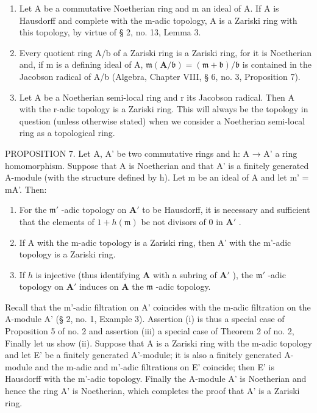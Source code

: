 \begin{enumerate}
\def\labelenumi{(\arabic{enumi})}
\item
  Let A be a commutative Noetherian ring and m an ideal of A. If A is Hausdorff and complete with the m-adic topology, A is a Zariski ring with this topology, by virtue of § 2, no. 13, Lemma 3.
\item
  Every quotient ring A/b of a Zariski ring is a Zariski ring, for it is Noetherian and, if m is a defining ideal of A, \(\mathfrak{m}(\mathbf{A}/\mathfrak{b}) = (\mathfrak{m} + \mathfrak{b})/\mathfrak{b}\) is contained in the Jacobson radical of A/b (Algebra, Chapter VIII, § 6, no. 3, Proposition 7).
\item
  Let A be a Noetherian semi-local ring and r its Jacobson radical. Then A with the r-adic topology is a Zariski ring. This will always be the topology in question (unless otherwise stated) when we consider a Noetherian semi-local ring as a topological ring.
\end{enumerate}

PROPOSITION 7. Let A, A' be two commutative rings and h: A → A' a ring homomorphism. Suppose that A is Noetherian and that A' is a finitely generated A-module (with the structure defined by h). Let m be an ideal of A and let m' = mA'. Then:

\begin{enumerate}
\def\labelenumi{(\roman{enumi})}
\item
  For the \(\mathfrak{m}'\) -adic topology on \(\mathbf{A}'\) to be Hausdorff, it is necessary and sufficient that the elements of \(1 + h(\mathfrak{m})\) be not divisors of 0 in \(\mathbf{A}'\) .
\item
  If A with the m-adic topology is a Zariski ring, then A' with the m'-adic topology is a Zariski ring.
\item
  If \(h\) is injective (thus identifying \(\mathbf{A}\) with a subring of \(\mathbf{A}'\) ), the \(\mathfrak{m}'\) -adic topology on \(\mathbf{A}'\) induces on \(\mathbf{A}\) the \(\mathfrak{m}\) -adic topology.
\end{enumerate}

Recall that the m'-adic filtration on A' coincides with the m-adic filtration on the A-module A' (§ 2, no. 1, Example 3). Assertion (i) is thus a special case of Proposition 5 of no. 2 and assertion (iii) a special case of Theorem 2 of no. 2, Finally let us show (ii). Suppose that A is a Zariski ring with the m-adic topology and let E' be a finitely generated A'-module; it is also a finitely generated A-module and the m-adic and m'-adic filtrations on E' coincide; then E' is Hausdorff with the m'-adic topology. Finally the A-module A' is Noetherian and hence the ring A' is Noetherian, which completes the proof that A' is a Zariski ring.

